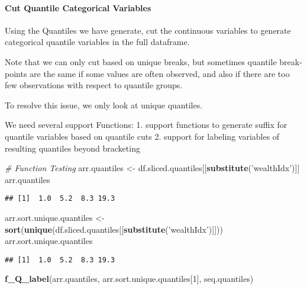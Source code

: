 \documentclass[
]{book}
\newenvironment{Shaded}{\begin{snugshade}}{\end{snugshade}}
\newcommand{\CommentTok}[1]{\textcolor[rgb]{0.56,0.35,0.01}{\textit{#1}}}
\newcommand{\DecValTok}[1]{\textcolor[rgb]{0.00,0.00,0.81}{#1}}
\newcommand{\KeywordTok}[1]{\textcolor[rgb]{0.13,0.29,0.53}{\textbf{#1}}}
\newcommand{\NormalTok}[1]{#1}
\newcommand{\StringTok}[1]{\textcolor[rgb]{0.31,0.60,0.02}{#1}}
\begin{document}
\hypertarget{cut-quantile-categorical-variables}{%
\paragraph{Cut Quantile Categorical Variables}\label{cut-quantile-categorical-variables}}

Using the Quantiles we have generate, cut the continuous variables to generate categorical quantile variables in the full dataframe.

Note that we can only cut based on unique breaks, but sometimes quantile break-points are the same if some values are often observed, and also if there are too few observations with respect to quantile groups.

To resolve this issue, we only look at unique quantiles.

We need several support Functions:
1. support functions to generate suffix for quantile variables based on quantile cuts
2. support for labeling variables of resulting quantiles beyond bracketing

\begin{Shaded}
\begin{Highlighting}[]
\CommentTok{# Function Testing}
\NormalTok{arr.quantiles <-}\StringTok{ }\NormalTok{df.sliced.quantiles[[}\KeywordTok{substitute}\NormalTok{(}\StringTok{'wealthIdx'}\NormalTok{)]]}
\NormalTok{arr.quantiles}
\end{Highlighting}
\end{Shaded}

\begin{verbatim}
## [1]  1.0  5.2  8.3 19.3
\end{verbatim}

\begin{Shaded}
\begin{Highlighting}[]
\NormalTok{arr.sort.unique.quantiles <-}\StringTok{ }\KeywordTok{sort}\NormalTok{(}\KeywordTok{unique}\NormalTok{(df.sliced.quantiles[[}\KeywordTok{substitute}\NormalTok{(}\StringTok{'wealthIdx'}\NormalTok{)]]))}
\NormalTok{arr.sort.unique.quantiles}
\end{Highlighting}
\end{Shaded}

\begin{verbatim}
## [1]  1.0  5.2  8.3 19.3
\end{verbatim}

\begin{Shaded}
\begin{Highlighting}[]
\KeywordTok{f_Q_label}\NormalTok{(arr.quantiles, arr.sort.unique.quantiles[}\DecValTok{1}\NormalTok{], seq.quantiles)}
\end{Highlighting}
\end{Shaded}
\end{document}

